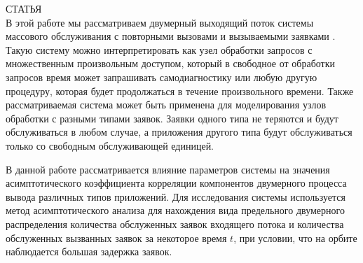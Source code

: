 СТАТЬЯ\\
В этой работе мы рассматриваем двумерный выходящий поток системы массового обслуживания \cite{kendall1953stochastic, lapatin2019asymptotic} с повторными вызовами \cite {jesus2008retrial} и вызываемыми заявками \cite {kulkarni1983queueing}. Такую систему можно интерпретировать как узел обработки запросов с множественным произвольным доступом, который в свободное от обработки запросов время может запрашивать самодиагностику или любую другую процедуру, которая будет продолжаться в течение произвольного времени. Также рассматриваемая система может быть применена для моделирования узлов обработки с разными типами заявок. Заявки одного типа не теряются и будут обслуживаться в любом случае, а приложения другого типа будут обслуживаться только со свободным обслуживающей единицей.


В данной работе рассматривается влияние параметров системы на значения асимптотического коэффициента корреляции компонентов двумерного процесса вывода различных типов приложений. Для исследования системы используется метод асимптотического анализа для нахождения вида предельного двумерного распределения количества обслуженных заявок входящего потока и количества обслуженных вызванных заявок за некоторое время $t$, при условии, что на орбите \cite{nazarov2017asymptotic} наблюдается большая задержка заявок.
 \clearpage